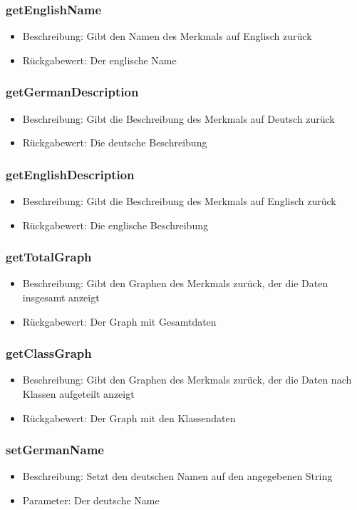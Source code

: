 \documentclass[a4paper]{scrreprt}
\begin{document}
	\subsubsection{getEnglishName}
	\begin{itemize}
		\item Beschreibung: Gibt den Namen des Merkmals auf Englisch zurück
		\item Rückgabewert: Der englische Name
	\end{itemize}
	\subsubsection{getGermanDescription}
	\begin{itemize}
		\item Beschreibung: Gibt die Beschreibung des Merkmals auf Deutsch zurück
		\item Rückgabewert: Die deutsche Beschreibung
	\end{itemize}
	\subsubsection{getEnglishDescription}
	\begin{itemize}
		\item Beschreibung: Gibt die Beschreibung des Merkmals auf Englisch zurück
		\item Rückgabewert: Die englische Beschreibung
	\end{itemize}
	\subsubsection{getTotalGraph}
	\begin{itemize}
		\item Beschreibung: Gibt den Graphen des Merkmals zurück, der die Daten insgesamt anzeigt
		\item Rückgabewert: Der Graph mit Gesamtdaten
	\end{itemize}
	\subsubsection{getClassGraph}
	\begin{itemize}
		\item Beschreibung: Gibt den Graphen des Merkmals zurück, der die Daten nach Klassen aufgeteilt anzeigt
		\item Rückgabewert: Der Graph mit den Klassendaten
	\end{itemize}
	\subsubsection{setGermanName}
	\begin{itemize}
		\item Beschreibung: Setzt den deutschen Namen auf den angegebenen String
		\item Parameter: Der deutsche Name
	\end{itemize}
\end{document}
